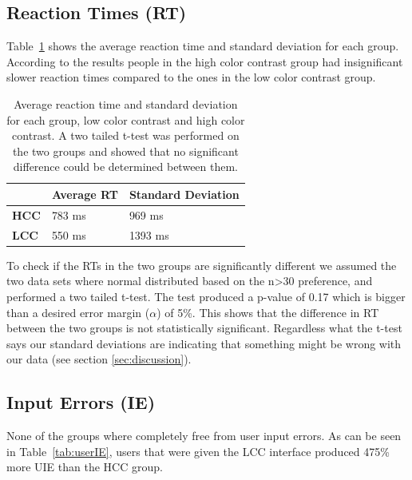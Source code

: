 \documentclass[runningheads,a4paper]{llncs}
\begin{document}
\subsection{Reaction Times (RT)}
Table~\ref{tab:groupRT} shows the average reaction time and standard deviation for each group. According to the results people in the high color contrast group had insignificant slower reaction times compared to the ones in the low color contrast group.

\begin{table}[]
	\centering
	\setlength{\tabcolsep}{1em}
	\setlength\extrarowheight{1em}
	\begin{tabular}{l|l|l}
		\textbf{} & \textbf{Average RT} & \textbf{Standard Deviation} \\ \hline
		\textbf{HCC} & 783 ms & 969 ms \\ \hline
		\textbf{LCC} & 550 ms & 1393 ms
	\end{tabular}
	\caption{Average reaction time and standard deviation for each group, low color contrast and high color contrast. A two tailed t-test was performed on the two groups and showed that no significant difference could be determined between them.
	\label{tab:groupRT}}
\end{table}

To check if the RTs in the two groups are significantly different we assumed the two data sets where normal distributed based on the n>30 preference, and performed a two tailed t-test. The test produced a p-value of 0.17 which is bigger than a desired error margin ($\alpha$) of 5\%. This shows that the difference in RT between the two groups is not statistically significant. Regardless what the t-test says our standard deviations are indicating that something might be wrong with our data (see section \ref{sec:discussion}).

\subsection{Input Errors (IE)}\label{subsec:InputErrors}
None of the groups where completely free from user input errors. As can be seen in Table~\ref{tab:userIE}, users that were given the LCC interface produced 475\% more UIE than the HCC group.
\end{document}
